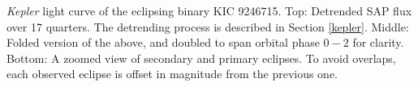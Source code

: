 \label{fig:keplerfig} \emph{Kepler} light curve of the eclipsing binary KIC 9246715. Top: Detrended SAP flux over 17 quarters. The detrending process is described in Section \ref{kepler}. Middle: Folded version of the above, and doubled to span orbital phase $0-2$ for clarity. Bottom: A zoomed view of secondary and primary eclipses. To avoid overlaps, each observed eclipse is offset in magnitude from the previous one.
